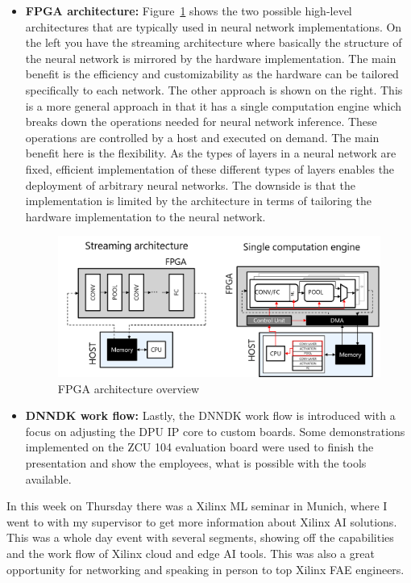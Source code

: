 \begin{itemize}
	\item \textbf{\ac{FPGA} architecture:} Figure~\ref{fig:fpga_arch} shows the two possible high-level architectures that are typically used in neural network implementations. On the left you have the streaming architecture where basically the structure of the neural network is mirrored by the hardware implementation. The main benefit is the efficiency and customizability as the hardware can be tailored specifically to each network. The other approach is shown on the right. This is a more general approach in that it has a single computation engine which breaks down the operations needed for neural network inference. These operations are controlled by a host and executed on demand. The main benefit here is the flexibility. As the types of layers in a neural network are fixed, efficient implementation of these different types of layers enables the deployment of arbitrary neural networks. The downside is that the implementation is limited by the architecture in terms of tailoring the hardware implementation to the neural network.
	\begin{figure}[!htb]
	\centering
		\includegraphics[width=\textwidth]{bilder/FPGA_arch.png}
		\caption{\acs{FPGA} architecture overview}
		\label{fig:fpga_arch}
\end{figure}
	\item \textbf{\ac{DNNDK} work flow:} Lastly, the \ac{DNNDK} work flow is introduced with a focus on adjusting the \ac{DPU} \ac{IP} core to custom boards. Some demonstrations implemented on the ZCU 104 evaluation board were used to finish the presentation and show the employees, what is possible with the tools available.
\end{itemize}
In this week on Thursday there was a Xilinx \ac{ML} seminar in Munich, where I went to with my supervisor to get more information about Xilinx \ac{AI} solutions. This was a whole day event with several segments, showing off the capabilities and the work flow of Xilinx cloud and edge \ac{AI} tools. This was also a great opportunity for networking and speaking in person to top Xilinx \ac{FAE} engineers.